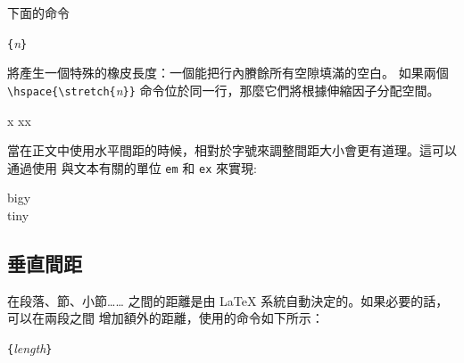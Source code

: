 \label{cmd:stretch}
下面的命令
\begin{lscommand}
\verb|{|\emph{n}\verb|}|
\end{lscommand}
\noindent 將產生一個特殊的橡皮長度：一個能把行內賸餘所有空隙填滿的空白。
如果兩個 \verb|\hspace{\stretch{|\emph{n}\verb|}}| 命令位於同一行，那麼它們將根據伸縮因子分配空間。

\begin{example}
x
xx
\end{example}

當在正文中使用水平間距的時候，相對於字號來調整間距大小會更有道理。這可以通過使用
與文本有關的單位 \texttt{em} 和 \texttt{ex} 來實現:
\begin{example}
{\Large{}big\hspace{1em}y}\\
{\tiny{}tin\hspace{1em}y}
\end{example}

\subsection{垂直間距}
在段落、節、小節…… 之間的距離是由 \LaTeX{} 系統自動決定的。如果必要的話，可以在兩段之間
增加額外的距離，使用的命令如下所示：
\begin{lscommand}
\verb|{|\emph{length}\verb|}|
\end{lscommand}

